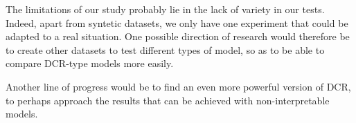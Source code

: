 \documentclass[sigconf, nonacm]{acmart}
\begin{document}
The limitations of our study probably lie in the lack of variety in our tests. Indeed, apart from syntetic datasets, we only have one experiment that could be adapted to a real situation. One possible direction of research would therefore be to create other datasets to test different types of model, so as to be able to compare DCR-type models more easily. 

Another line of progress would be to find an even more powerful version of DCR, to perhaps approach the results that can be achieved with non-interpretable models.
\vspace{8pt}




\end{document}
